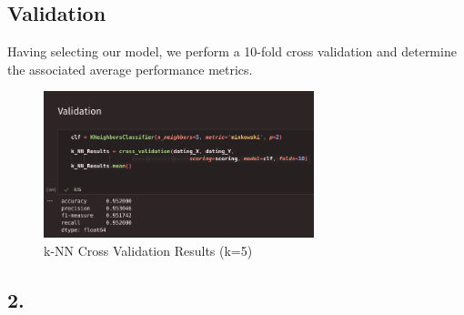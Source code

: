 \documentclass{article}
\begin{document}
    \newpage

    \subsection*{Validation}

    Having selecting our model, we perform a 10-fold cross validation and determine the associated average performance
    metrics.

    \begin{figure}[H]
        \centering
        \includegraphics[width=0.7\textwidth, height=0.2\textheight]{k-NN_validation.png}
        \caption{\small{k-NN Cross Validation Results (k=5)}}
    \end{figure}


    \newpage

    \subsection*{2.}
\end{document}
